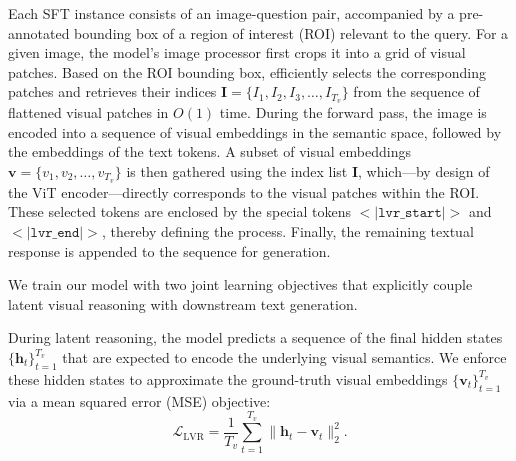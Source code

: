 
Each SFT instance consists of an image-question pair, accompanied by a pre-annotated bounding box of a region of interest (ROI) relevant to the query. For a given image, the model’s image processor first crops it into a grid of visual patches. Based on the ROI bounding box, \modelname efficiently selects the corresponding patches and retrieves their indices $\mathbf{I}=\{I_1, I_2, I_3, \dots, I_{T_v}\}$ from the sequence of flattened visual patches in $O(1)$ time. During the forward pass, the image is encoded into a  sequence of visual embeddings in the semantic space, followed by the embeddings of the text tokens. A subset of visual embeddings $\mathbf{v} = \{v_1, v_2, \dots, v_{T_v} \} $ is then gathered using the index list $\mathbf{I}$, which—by design of the ViT encoder—directly corresponds to the visual patches within the ROI. These selected tokens are enclosed by the special tokens $<\vert\texttt{lvr\_start}\vert>$ and $<\vert\texttt{lvr\_end}\vert>$, thereby defining the \modelfullname process. Finally, the remaining textual response is appended to the sequence for generation.

We train our model with two joint learning objectives that explicitly couple latent visual reasoning with downstream text generation.

During latent reasoning, the model predicts a sequence of the final hidden states $\{ \mathbf{h}_t \}_{t=1}^{T_v}$ that are expected to encode the underlying visual semantics.  
We enforce these hidden states to approximate the ground-truth visual embeddings $\{ \mathbf{v}_t \}_{t=1}^{T_v}$ via a mean squared error (MSE) objective:
\begin{equation}
\mathcal{L}_{\mathrm{LVR}} 
= \frac{1}{T_v} \sum_{t=1}^{T_v} \big\| \mathbf{h}_t - \mathbf{v}_t \big\|_2^2 .
\end{equation}

